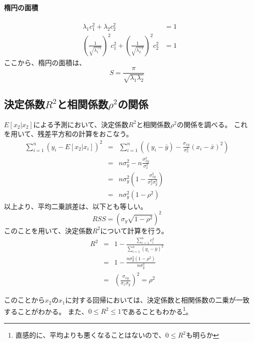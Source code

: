 \paragraph{楕円の面積}

\begin{eqnarray*}
 &\lambda_1c_1^2+\lambda_2c_2^2 &= 1 \\
 &\left(\frac{1}{\sqrt{\lambda_1^{-1}}}\right)^2c_1^2+\left(\frac{1}{\sqrt{\lambda_2^{-1}}}\right)^2c_2^2&=1
\end{eqnarray*}
ここから、楕円の面積は、
\begin{equation*}
 S = \frac{\pi}{\sqrt{\lambda_1\lambda_2}}
\end{equation*}

\subsection{決定係数$R^2$と相関係数$\rho^2$の関係}
$E[x_2|x_2]$による予測において、決定係数$R^2$と相関係数$\rho^2$の関係を調べる。
これを用いて、残差平方和の計算をおこなう。
\begin{eqnarray*}
 \sum_{i=1}^n (y_i-E[x_2|x_i])^2 &=&   \sum_{i=1}^n ((y_i-\bar{y})-\frac{\sigma_{xy}}{\sigma^2_x}(x_i-\bar{x})^2)\\
 &=& n\sigma^2_y -n \frac{\sigma^2_{xy}}{\sigma_x^2} \\
 &=& n\sigma_y^2(1-\frac{\sigma^2_{xy}}{\sigma^2_x\sigma_y^2}) \\
 &=& n\sigma_y^2(1-\rho^2)
\end{eqnarray*}
以上より、平均二乗誤差は、以下とも等しい。
\begin{equation*}
 RSS = (\sigma_y\sqrt{1-\rho^2})^2
\end{equation*}
このことを用いて、決定係数$R^2$について計算を行う。
\begin{eqnarray*}
 R^2 &=& 1-\frac{\sum_{i=1}^n e_i^2}{\sum_{i=1}^n (y_i-\bar{y})^2} \\
 &=& 1-\frac{n\sigma_y^2(1-\rho^2)}{n\sigma^2_y} \\
 &=& \left( \frac{\sigma_{xy}}{\sigma_x\sigma_y}\right)^2 = \rho^2
\end{eqnarray*}

このことから$x_2$の$x_1$に対する回帰においては、決定係数と相関係数の二乗が一致することがわかる。
また、$0\leq R^2\leq 1$であることもわかる\footnote{直感的に、平均よりも悪くなることはないので、$0\leq R^2$も明らか}。

